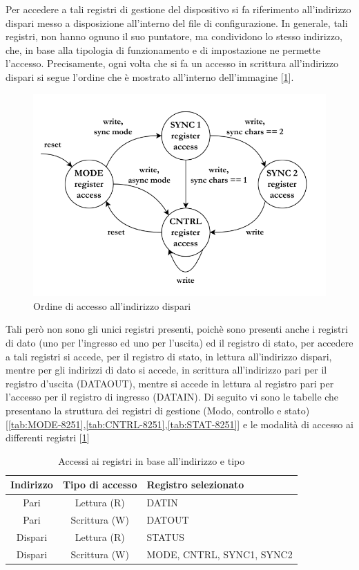 Per accedere a tali registri di gestione del dispositivo si fa riferimento all'indirizzo dispari messo a disposizione all'interno del file di configurazione. In generale, tali registri, non hanno ognuno il suo puntatore, ma condividono lo stesso indirizzo, che, in base alla tipologia di funzionamento e di impostazione ne permette l'accesso. Precisamente, ogni volta che si fa un accesso in scrittura all'indirizzo dispari si segue l'ordine che è mostrato all'interno dell'immagine [\ref{img:accesso-registri}].

\begin{figure}[ht]
    \centering
    \includegraphics[width=.5\textwidth]{img/registri-8251A.png}
    \caption{Ordine di accesso all'indirizzo dispari}\label{img:accesso-registri}
\end{figure}
Tali però non sono gli unici registri presenti, poichè sono presenti anche i registri di dato (uno per l'ingresso ed uno per l'uscita) ed il registro di stato, per accedere a tali registri si accede, per il registro di stato, in lettura all'indirizzo dispari, mentre per gli indirizzi di dato si accede, in scrittura all'indirizzo pari per il registro d'uscita (DATAOUT), mentre si accede in lettura al registro pari per l'accesso per il registro di ingresso (DATAIN). Di seguito vi sono le tabelle che presentano la struttura dei registri di gestione (Modo, controllo e stato) [\ref{tab:MODE-8251},\ref{tab:CNTRL-8251},\ref{tab:STAT-8251}] e le modalità di accesso ai differenti registri [\ref{tab:accessi}]
\begin{table}[ht]
    \centering
    \begin{tabular}{|c|c|l|}
    \hline
    \textbf{Indirizzo} & \textbf{Tipo di accesso} & \textbf{Registro selezionato} \\
    \hline
    Pari   & Lettura (R) & DATIN \\
    Pari   & Scrittura (W) & DATOUT \\
    Dispari & Lettura (R) & STATUS \\
    Dispari & Scrittura (W) & MODE, CNTRL, SYNC1, SYNC2 \\
    \hline
    \end{tabular}
    \caption{Accessi ai registri in base all'indirizzo e tipo}\label{tab:accessi}
\end{table}
    
